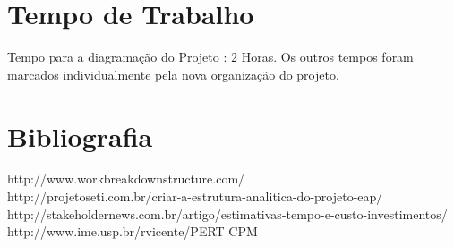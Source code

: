 \documentclass[12pt,a4paper,final]{article}
\begin{document}
\section{Tempo de Trabalho}

Tempo para a diagramação do Projeto : 2 Horas.
Os outros tempos foram marcados individualmente pela nova organização do projeto.
\section{Bibliografia}
http://www.workbreakdownstructure.com/\\
http://projetoseti.com.br/criar-a-estrutura-analitica-do-projeto-eap/\\
http://stakeholdernews.com.br/artigo/estimativas-tempo-e-custo-investimentos/\\
http://www.ime.usp.br/rvicente/PERT CPM
\end{document}

